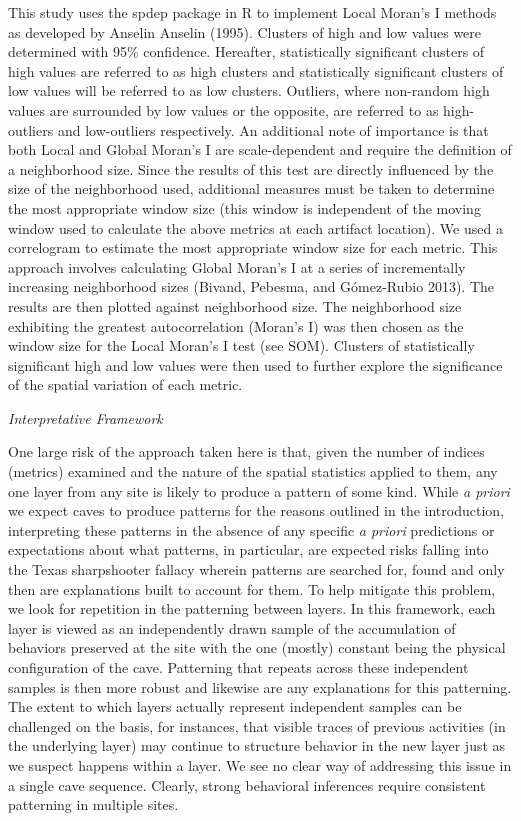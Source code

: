 \documentclass[smallextended]{svjour3}       %
\begin{document}
This study uses the spdep package in R to implement Local Moran's I
methods as developed by Anselin Anselin (1995). Clusters of high and low
values were determined with 95\% confidence. Hereafter, statistically
significant clusters of high values are referred to as high clusters and
statistically significant clusters of low values will be referred to as
low clusters. Outliers, where non-random high values are surrounded by
low values or the opposite, are referred to as high-outliers and
low-outliers respectively. An additional note of importance is that both
Local and Global Moran's I are scale-dependent and require the
definition of a neighborhood size. Since the results of this test are
directly influenced by the size of the neighborhood used, additional
measures must be taken to determine the most appropriate window size
(this window is independent of the moving window used to calculate the
above metrics at each artifact location). We used a correlogram to
estimate the most appropriate window size for each metric. This approach
involves calculating Global Moran's I at a series of incrementally
increasing neighborhood sizes (Bivand, Pebesma, and Gómez-Rubio 2013).
The results are then plotted against neighborhood size. The neighborhood
size exhibiting the greatest autocorrelation (Moran's I) was then chosen
as the window size for the Local Moran's I test (see SOM). Clusters of
statistically significant high and low values were then used to further
explore the significance of the spatial variation of each metric.

\emph{Interpretative Framework}

One large risk of the approach taken here is that, given the number of
indices (metrics) examined and the nature of the spatial statistics
applied to them, any one layer from any site is likely to produce a
pattern of some kind. While \emph{a priori} we expect caves to produce
patterns for the reasons outlined in the introduction, interpreting
these patterns in the absence of any specific \emph{a priori}
predictions or expectations about what patterns, in particular, are
expected risks falling into the Texas sharpshooter fallacy wherein
patterns are searched for, found and only then are explanations built to
account for them. To help mitigate this problem, we look for repetition
in the patterning between layers. In this framework, each layer is
viewed as an independently drawn sample of the accumulation of behaviors
preserved at the site with the one (mostly) constant being the physical
configuration of the cave. Patterning that repeats across these
independent samples is then more robust and likewise are any
explanations for this patterning. The extent to which layers actually
represent independent samples can be challenged on the basis, for
instances, that visible traces of previous activities (in the underlying
layer) may continue to structure behavior in the new layer just as we
suspect happens within a layer. We see no clear way of addressing this
issue in a single cave sequence. Clearly, strong behavioral inferences
require consistent patterning in multiple sites.
\end{document}
